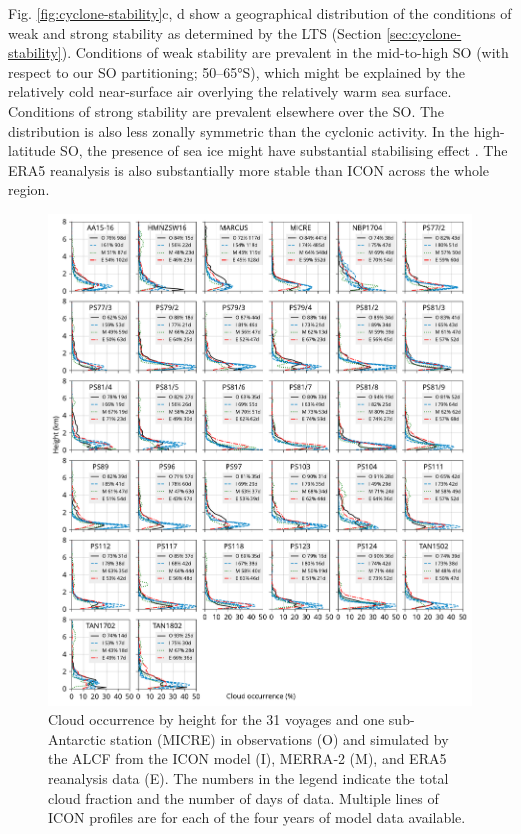 \documentclass[12pt,a4paper]{article}
\begin{document}
Fig. \ref{fig:cyclone-stability}c, d show a geographical distribution of the
conditions of weak and strong stability as determined by the LTS (Section
\ref{sec:cyclone-stability}). Conditions of weak stability are prevalent in the
mid-to-high SO (with respect to our SO partitioning; 50--65°S), which might be
explained by the relatively cold near-surface air overlying the relatively warm
sea surface. Conditions of strong stability are prevalent elsewhere over the
SO. The distribution is also less zonally symmetric than the cyclonic activity.
In the high-latitude SO, the presence of sea ice might have substantial
stabilising effect \citep{knight2024}. The ERA5 reanalysis is also
substantially more stable than ICON across the whole region.

\begin{figure}[p!]
\centerline{
\includegraphics[width=1.06\textwidth]{img/cloud_occurrence_panel.pdf}
}
\caption{
Cloud occurrence by height for the 31 voyages and one sub-Antarctic
station (MICRE) in observations (O) and simulated by the ALCF from the ICON
model (I), MERRA‐2 (M), and ERA5 reanalysis data (E). The numbers in the legend
indicate the total cloud fraction and the number of days of data. Multiple lines
of ICON profiles are for each of the four years of model data available.
}
\label{fig:cloud-occurrence-panel}
\end{figure}
\end{document}
